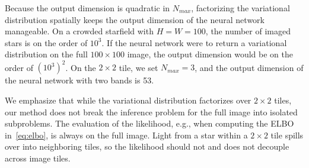 
Because the output dimension is quadratic in $N_{max}$, factorizing the variational distribution spatially keeps the output dimension of the neural network manageable.
On a crowded starfield with $H = W = 100$, the number of imaged stars is on the order of $10^3$.
If the neural network were to return a variational distribution on the full $100\times 100$ image, the output dimension would be on the order of $(10^3)^2$. 
On the $2\times 2$ tile, we set $N_{max} = 3$, and the output dimension of the neural network with two bands is 53. 



We emphasize that while the variational distribution factorizes over $2 \times 2$ tiles, our method does not break the inference problem for the full image into isolated subproblems. The evaluation of the likelihood, e.g., when computing the ELBO in~\eqref{eq:elbo}, is always on the full image. Light from a star within a $2 \times 2$ tile spills over into neighboring tiles, so the likelihood should not and does not decouple across image tiles. 

